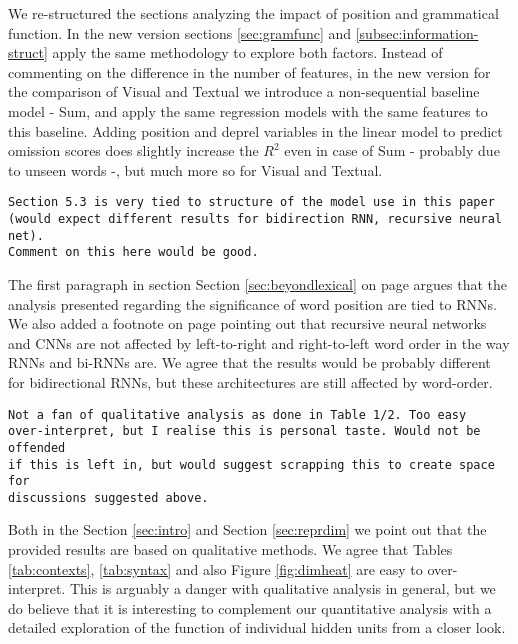\documentclass{article}
\begin{document}
We re-structured the sections analyzing the impact of position 
and grammatical function. In the new version sections
\ref{sec:gramfunc} and \ref{subsec:information-struct} 
apply the same methodology to explore both factors. 
Instead of commenting  on the difference in the number of features, in the new
version for the comparison of {\sc Visual} and {\sc Textual} 
we introduce a non-sequential baseline model - {\sc Sum}, and apply
the same regression models with the same features to this baseline.
Adding position and deprel variables in the linear model
to predict omission scores does slightly increase the $R^2$ 
even in case of {\sc Sum} - probably
due to unseen words -, but much more so for {\sc Visual} and {\sc
  Textual}.  

\begin{verbatim}
Section 5.3 is very tied to structure of the model use in this paper
(would expect different results for bidirection RNN, recursive neural net).
Comment on this here would be good.
\end{verbatim}

The first paragraph in section Section \ref{sec:beyondlexical}
on page \pageref{edit:beyonlexicalgeneral} argues that the analysis
presented regarding the significance of word position are tied to RNNs. 
We also added a footnote on page \pageref{edit:foot} 
pointing out that recursive neural networks
and CNNs are not affected by left-to-right and right-to-left word order
in the way RNNs and bi-RNNs are. We agree that the results 
would be probably different for bidirectional RNNs, but these 
architectures are still affected by word-order.

\begin{verbatim}
Not a fan of qualitative analysis as done in Table 1/2. Too easy
over-interpret, but I realise this is personal taste. Would not be offended
if this is left in, but would suggest scrapping this to create space for
discussions suggested above.
\end{verbatim}

Both in the Section \ref{sec:intro} and Section \ref{sec:reprdim}
we point out that the provided results are based on qualitative methods.
We agree that Tables \ref{tab:contexts}, \ref{tab:syntax} 
and also Figure \ref{fig:dimheat} are easy 
to over-interpret. This is arguably a danger with 
qualitative analysis in general, but we do believe that it is interesting
to complement our quantitative analysis with a detailed exploration
of the function of individual hidden units from a closer look.
\end{document}
